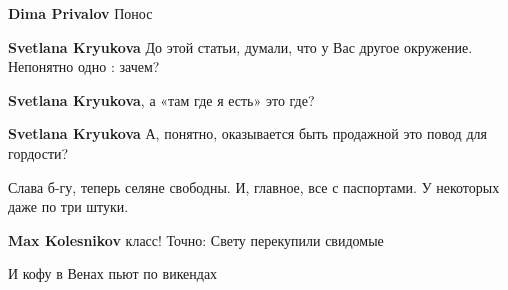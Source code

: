 \begin{itemize}
\begin{itemize}
\textbf{Dima Privalov} Понос

 
\textbf{Svetlana Kryukova} До этой статьи, думали, что у Вас другое окружение. Непонятно одно : зачем?

 
\textbf{Svetlana Kryukova}, а «там где я есть» это где?

 
\textbf{Svetlana Kryukova} А, понятно, оказывается быть продажной это повод для гордости?

\end{itemize}

 
Слава б-гу, теперь селяне свободны. И, главное, все с паспортами. У некоторых даже по три штуки.

\begin{itemize}
 
\textbf{Max Kolesnikov} класс! Точно: Свету перекупили свидомые

 
И кофу в Венах пьют по викендах

 

\end{itemize}
\end{itemize}
